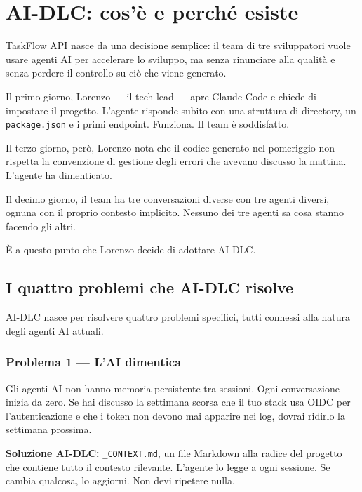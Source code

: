 ﻿%

\chapter{AI-DLC: cos'è e perché esiste}
\label{ch:cose-adlc}

TaskFlow API nasce da una decisione semplice: il team di tre sviluppatori vuole usare agenti AI per accelerare lo sviluppo, ma senza rinunciare alla qualità e senza perdere il controllo su ciò che viene generato.

Il primo giorno, Lorenzo --- il tech lead --- apre Claude Code e chiede di impostare il progetto. L'agente risponde subito con una struttura di directory, un \texttt{package.json} e i primi endpoint. Funziona. Il team è soddisfatto.

Il terzo giorno, però, Lorenzo nota che il codice generato nel pomeriggio non rispetta la convenzione di gestione degli errori che avevano discusso la mattina. L'agente ha dimenticato.

Il decimo giorno, il team ha tre conversazioni diverse con tre agenti diversi, ognuna con il proprio contesto implicito. Nessuno dei tre agenti sa cosa stanno facendo gli altri.

È a questo punto che Lorenzo decide di adottare AI-DLC.

\section{I quattro problemi che AI-DLC risolve}
\label{sec:01-quattro-problemi}

AI-DLC nasce per risolvere quattro problemi specifici, tutti connessi alla natura degli agenti AI attuali.

\subsection*{Problema 1 --- L'AI dimentica}

Gli agenti AI non hanno memoria persistente tra sessioni. Ogni conversazione inizia da zero. Se hai discusso la settimana scorsa che il tuo stack usa OIDC per l'autenticazione e che i token non devono mai apparire nei log, dovrai ridirlo la settimana prossima.

\textbf{Soluzione AI-DLC:} \texttt{\_CONTEXT.md}, un file Markdown alla radice del progetto che contiene tutto il contesto rilevante. L'agente lo legge a ogni sessione. Se cambia qualcosa, lo aggiorni. Non devi ripetere nulla.

